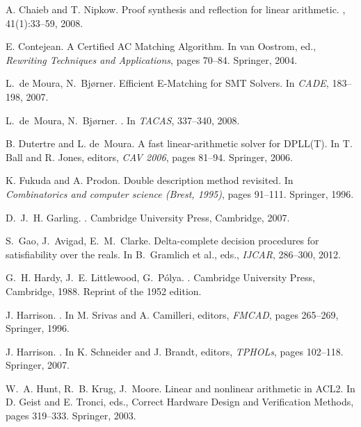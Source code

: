 \documentclass[runningheds]{llncs}
\begin{document}
\begin{thebibliography}{10}
A. Chaieb and T. Nipkow.
\newblock Proof synthesis and reflection for linear arithmetic.
, 41(1):33--59, 2008.

E. Contejean.
\newblock A Certified AC Matching Algorithm.
\newblock In van Oostrom, ed., {\em Rewriting Techniques and Applications}, pages 70--84. Springer, 2004.

L.~de Moura, N.~Bj{\o}rner.
\newblock Efficient E-Matching for SMT Solvers. 
\newblock In {\em CADE}, 183--198, 2007.

L.~de~Moura, N.~Bj{\o}rner.
.
\newblock In {\em {TACAS}}, 337--340, 2008.

B. Dutertre and L. de~Moura.
\newblock A fast linear-arithmetic solver for DPLL(T).
\newblock In T. Ball and R. Jones, editors, {\em CAV 2006}, pages 81--94. 
Springer, 2006.

K. Fukuda and A. Prodon.
\newblock Double description method revisited.
\newblock In {\em Combinatorics and computer science ({B}rest, 1995)}, pages 91--111. Springer,
  1996.

D.~J.~H. Garling.
.
\newblock Cambridge University Press, Cambridge, 2007.

S.~Gao, J.~Avigad, E.~M.~Clarke.
\newblock Delta-complete decision procedures for satisfiability over the reals.
\newblock In B.~Gramlich et al., eds., {\em IJCAR}, 286--300, 2012. 

G.~H. Hardy, J.~E. Littlewood,  G.~P\'{o}lya.
.
\newblock Cambridge University Press, Cambridge, 1988.
\newblock Reprint of the 1952 edition.

J. Harrison.
.
\newblock In M. Srivas and A. Camilleri, editors, {\em {FMCAD}}, pages 265--269, Springer, 1996.

J. Harrison.
.
\newblock In K. Schneider and J. Brandt, editors, {\em {TPHOLs}}, pages 102--118. Springer,
  2007.

W.~A. Hunt, R.~B. Krug, J.~Moore.
\newblock Linear and nonlinear arithmetic in ACL2.
\newblock In D. Geist and E. Tronci, eds., {Correct Hardware Design and Verification Methods},
pages 319--333. Springer, 2003.
    

\end{thebibliography}
\end{document}
